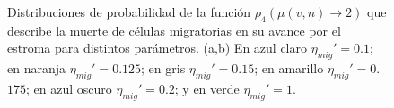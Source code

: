 \begin{figure}[!ht]
\begin{center}
\end{center}\vspace*{-0.5cm}
\caption[Distribuciones de probabilidad de la funci\'on $\rho_4(\mu(v,n) \rightarrow 2)$ que describe la muerte de c\'elulas migratorias en su avance por el estroma para distintos par\'ametros]{Distribuciones de probabilidad de la funci\'on $\rho_4(\mu(v,n) \rightarrow 2)$ que describe la muerte de c\'elulas migratorias en su avance por el estroma para distintos par\'ametros. (a,b) En azul claro $\eta_{mig}'=0$.$1$; en naranja $\eta_{mig}'=0$.$125$; en gris $\eta_{mig}'=0$.$15$; en amarillo $\eta_{mig}'=0$.$175$; en azul oscuro $\eta_{mig}'=0$.$2$; y en verde $\eta_{mig}'=1$. }
\label{graph-probability-migration}
\end{figure}

